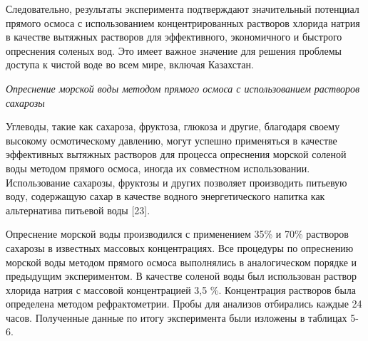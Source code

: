 \begin{multicols}{2}
Следовательно, результаты эксперимента подтверждают значительный
потенциал прямого осмоса с использованием концентрированных растворов
хлорида натрия в качестве вытяжных растворов для эффективного,
экономичного и быстрого опреснения соленых вод. Это имеет важное
значение для решения проблемы доступа к чистой воде во всем мире,
включая Казахстан.

\emph{Опреснение морской воды методом прямого осмоса с использованием
растворов сахарозы}

Углеводы, такие как сахароза, фруктоза, глюкоза и другие, благодаря
своему высокому осмотическому давлению, могут успешно применяться в
качестве эффективных вытяжных растворов для процесса опреснения морской
соленой воды методом прямого осмоса, иногда их совместном использовании.
Использование сахарозы, фруктозы и других позволяет производить питьевую
воду, содержащую сахар в качестве водного энергетического напитка как
альтернатива питьевой воды {[}23{]}.

Опреснение морской воды производился с применением 35\% и 70\% растворов
сахарозы в известных массовых концентрациях. Все процедуры по опреснению
морской воды методом прямого осмоса выполнялись в аналогическом порядке
и предыдущим экспериментом. В качестве соленой воды был использован
раствор хлорида натрия с массовой концентрацией 3,5 \%. Концентрация
растворов была определена методом рефрактометрии. Пробы для анализов
отбирались каждые 24 часов. Полученные данные по итогу эксперимента были
изложены в таблицах 5-6.
\end{multicols}

